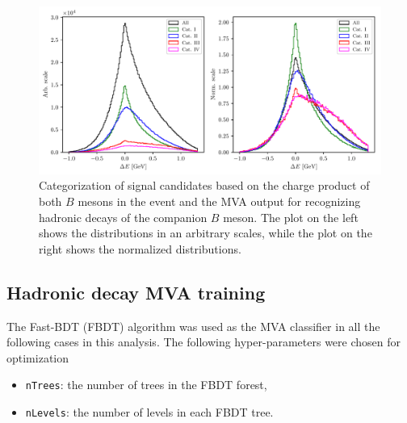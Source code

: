 \begin{figure}[H]
\centering
\captionsetup{width=0.8\linewidth}
\includegraphics[width=\linewidth]{fig/sig_categ}
\caption{Categorization of signal candidates based on the charge product of both $B$ mesons in the event and the MVA output for recognizing hadronic decays of the companion $B$ meson. The plot on the left shows the distributions in an arbitrary scales, while the plot on the right shows the normalized distributions.}
\label{fig:sig_categ}
\end{figure}


\subsection{Hadronic decay MVA training}
\label{subs:HDMVA}

The Fast-BDT (FBDT) \cite{keck2017fastbdt} algorithm was used as the MVA classifier in all the following cases in this analysis. The following hyper-parameters were chosen for optimization
\begin{itemize}
\item \texttt{nTrees}: the number of trees in the FBDT forest,
\item \texttt{nLevels}: the number of levels in each FBDT tree.
\end{itemize}

